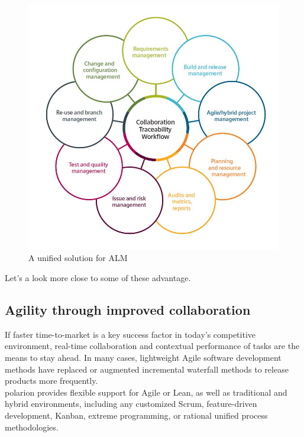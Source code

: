 \documentclass[thesis=M,english]{FITthesis}[2012/06/26]
\begin{document}
\begin{figure}[h!]\centering
	\includegraphics[width=1\textwidth]{pictures/alm_unified_processes}
	\caption{A unified solution for ALM \cite{polarion_alm}}\label{fig:alm_unified_solutionc}
\end{figure}

Let's a look more close to some of these advantage.

\subsection{Agility through improved collaboration}

If faster time-to-market is a key success factor in today’s competitive environment, real-time collaboration and contextual performance 
of tasks are the means to stay ahead. In many cases, lightweight Agile software development methods have replaced or augmented incremental waterfall methods to release products more frequently.\\

\acrshort{polarion} provides flexible support for Agile or Lean, as well as traditional and hybrid environments, including any customized Scrum, feature-driven development, Kanban, extreme programming, or rational unified process methodologies.\\
\end{document}
